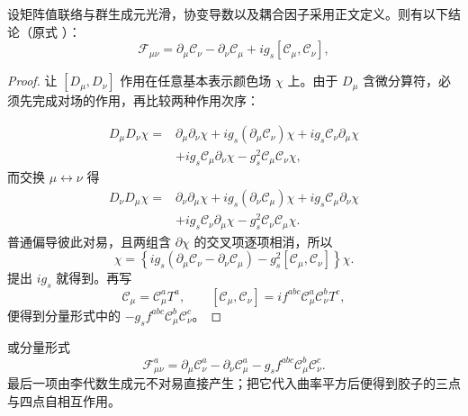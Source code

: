 \begin{proposition}[联络曲率的对易子表达]
设矩阵值联络与群生成元光滑，协变导数以及耦合因子采用正文定义。则有以下结论（原式 ）：
\begin{equation*}
\boxed{
\mathcal F_{\mu\nu}
=\partial_\mu\mathscr C_\nu-\partial_\nu\mathscr C_\mu
+i g_s[\mathscr C_\mu,\mathscr C_\nu],}
\end{equation*}
\end{proposition}
\begin{proof}
让 $[D_\mu,D_\nu]$ 作用在任意基本表示颜色场 $\chi$ 上。由于 $D_\mu$ 含微分算符，必须先完成对场的作用，再比较两种作用次序：

\begin{align*}
D_\mu D_\nu\chi
={}&\partial_\mu\partial_\nu\chi
+i g_s(\partial_\mu\mathscr C_\nu)\chi
+i g_s\mathscr C_\nu\partial_\mu\chi\\
&+i g_s\mathscr C_\mu\partial_\nu\chi
-g_s^2\mathscr C_\mu\mathscr C_\nu\chi,
\end{align*}
而交换 $\mu\leftrightarrow\nu$ 得
\begin{align*}
D_\nu D_\mu\chi
={}&\partial_\nu\partial_\mu\chi
+i g_s(\partial_\nu\mathscr C_\mu)\chi
+i g_s\mathscr C_\mu\partial_\nu\chi\\
&+i g_s\mathscr C_\nu\partial_\mu\chi
-g_s^2\mathscr C_\nu\mathscr C_\mu\chi.
\end{align*}
普通偏导彼此对易，且两组含 $\partial\chi$ 的交叉项逐项相消，所以
\begin{equation*}
[D_\mu,D_\nu]\chi
=\left\{i g_s(\partial_\mu\mathscr C_\nu-\partial_\nu\mathscr C_\mu)
-g_s^2[\mathscr C_\mu,\mathscr C_\nu]\right\}\chi.
\end{equation*}
提出 $i g_s$ 就得到。再写
\begin{equation*}
\mathscr C_\mu=\mathscr C_\mu^aT^a,
\qquad
[\mathscr C_\mu,\mathscr C_\nu]
=i f^{abc}\mathscr C_\mu^a\mathscr C_\nu^bT^c,
\end{equation*}
便得到分量形式中的 $-g_sf^{abc}\mathscr C_\mu^b\mathscr C_\nu^c$。
\end{proof}

或分量形式
\begin{equation*}
\mathcal F_{\mu\nu}^a
=\partial_\mu\mathscr C_\nu^a-\partial_\nu\mathscr C_\mu^a
-g_sf^{abc}\mathscr C_\mu^b\mathscr C_\nu^c.
\end{equation*}
最后一项由李代数生成元不对易直接产生；把它代入曲率平方后便得到胶子的三点与四点自相互作用。

